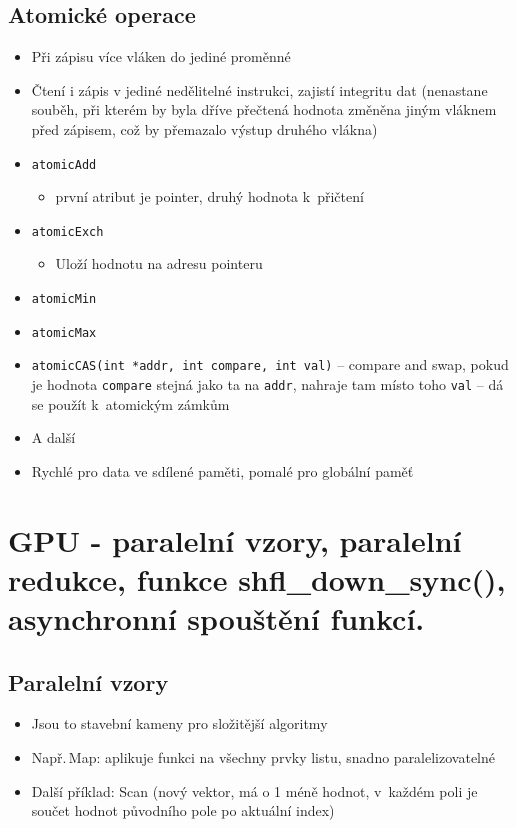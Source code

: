 \subsection{Atomické operace}
\begin{itemize}
    \item Při zápisu více vláken do jediné proměnné
    \item Čtení i zápis v jediné nedělitelné instrukci, zajistí integritu dat (nenastane souběh, při kterém by byla dříve přečtená hodnota změněna jiným vláknem před zápisem, což by přemazalo výstup druhého vlákna)
    \item \texttt{atomicAdd}
    \begin{itemize}
        \item první atribut je pointer, druhý hodnota k~přičtení
    \end{itemize}
    \item \texttt{atomicExch}
    \begin{itemize}
        \item Uloží hodnotu na adresu pointeru
    \end{itemize}
    \item \texttt{atomicMin}
    \item \texttt{atomicMax}
    \item \texttt{atomicCAS(int *addr, int compare, int val)} -- compare and swap, pokud je hodnota \texttt{compare} stejná jako ta na \texttt{addr}, nahraje tam místo toho \texttt{val} -- dá se použít k~atomickým zámkům
    \item A další
    \item Rychlé pro data ve sdílené paměti, pomalé pro globální paměť
\end{itemize}

\section{GPU - paralelní vzory, paralelní redukce, funkce shfl\_down\_sync(), asynchronní spouštění funkcí.}

\subsection{Paralelní vzory}
\begin{itemize}
    \item Jsou to stavební kameny pro složitější algoritmy
    \item Např.\,Map: aplikuje funkci na všechny prvky listu, snadno paralelizovatelné
    \item Další příklad: Scan (nový vektor, má o 1 méně hodnot, v~každém poli je součet hodnot původního pole po aktuální index)
\end{itemize}
